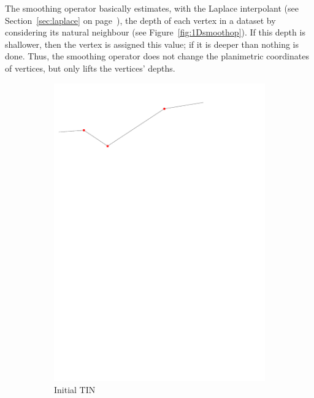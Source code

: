 The smoothing operator basically estimates, with the Laplace interpolant (see Section~\ref{sec:laplace} on page~\pageref{sec:laplace}), the depth of each vertex in a dataset by considering its natural neighbour (see Figure~\ref{fig:1Dsmoothop}).
If this depth is shallower, then the vertex is assigned this value; if it is deeper than nothing is done.
Thus, the smoothing operator does not change the planimetric coordinates of vertices, but only lifts the vertices' depths. 
\begin{figure}[tbh]
  \centering
  \begin{subfigure}[b]{0.45\linewidth}
    \centering
    \includegraphics[width=\textwidth,page=1]{figs/1Dsmoothop.pdf}
    \caption{Initial TIN}\label{fig:1Dsmoothop:a}
  \end{subfigure}
  \quad
  \begin{subfigure}[b]{0.45\linewidth}
    \centering

\end{subfigure}
\end{figure}

